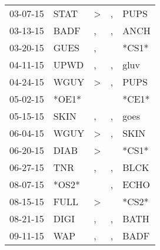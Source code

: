 \begin{supertabular}{p{0.07\textwidth}p{0.06\textwidth}p{0.02\textwidth}p{0.02\textwidth}p{0.06\textwidth}}
          03-07-15\textsuperscript{} &           STAT\textsuperscript{} &     \textgreater &                , &           PUPS\textsuperscript{} \\
          03-13-15\textsuperscript{} &           BADF\textsuperscript{} &                , &                , &           ANCH\textsuperscript{} \\
          03-20-15\textsuperscript{} &           GUES\textsuperscript{} &                , &                  &                            *CS1* \\
          04-11-15\textsuperscript{} &           UPWD\textsuperscript{} &                , &                , &           gluv\textsuperscript{} \\
          04-24-15\textsuperscript{} &           WGUY\textsuperscript{} &     \textgreater &                , &           PUPS\textsuperscript{} \\
          05-02-15\textsuperscript{} &                            *OE1* &                  &                  &                            *CE1* \\
          05-15-15\textsuperscript{} &           SKIN\textsuperscript{} &                , &                , &           goes\textsuperscript{} \\
          06-04-15\textsuperscript{} &           WGUY\textsuperscript{} &     \textgreater &                , &           SKIN\textsuperscript{} \\
          06-20-15\textsuperscript{} &           DIAB\textsuperscript{} &     \textgreater &                  &                            *CS1* \\
          06-27-15\textsuperscript{} &            TNR\textsuperscript{} &                , &                , &           BLCK\textsuperscript{} \\
          08-07-15\textsuperscript{} &                            *OS2* &                  &                , &           ECHO\textsuperscript{} \\
          08-15-15\textsuperscript{} &           FULL\textsuperscript{} &     \textgreater &                  &                            *CS2* \\
          08-21-15\textsuperscript{} &           DIGI\textsuperscript{} &                , &                , &           BATH\textsuperscript{} \\
          09-11-15\textsuperscript{} &            WAP\textsuperscript{} &                , &                , &           BADF\textsuperscript{} \\

\end{supertabular}
